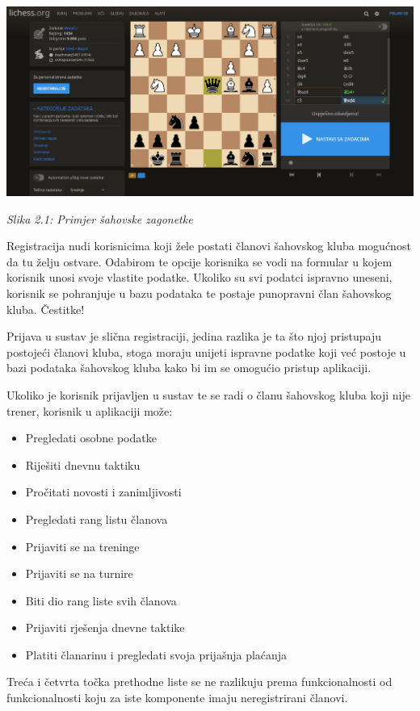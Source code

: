 \documentclass{article}
\begin{document}
		\includegraphics[width=\columnwidth]{lichess_primjer}
		\begin{center}
			\textit{Slika 2.1: Primjer šahovske zagonetke}
		\end{center}
		
		Registracija nudi korisnicima koji žele postati članovi šahovskog kluba mogućnost da tu želju ostvare. Odabirom te opcije korisnika se vodi na formular u kojem korisnik unosi svoje vlastite podatke. Ukoliko su svi podatci ispravno uneseni, korisnik se pohranjuje u bazu podataka te postaje punopravni član šahovskog kluba. Čestitke!
		
		Prijava u sustav je slična registraciji, jedina razlika je ta što njoj pristupaju postojeći članovi kluba, stoga moraju unijeti ispravne podatke koji već postoje u bazi podataka šahovskog kluba kako bi im se omogućio pristup aplikaciji. 
		
		Ukoliko je korisnik prijavljen u sustav te se radi o članu šahovskog kluba koji nije trener, korisnik u aplikaciji može: 
		\begin{itemize}
			\item Pregledati osobne podatke 
			\item Riješiti dnevnu taktiku 
			\item Pročitati novosti i zanimljivosti 
			\item Pregledati rang listu članova 
			\item Prijaviti se na treninge 
			\item Prijaviti se na turnire
			\item Biti dio rang liste svih članova 
			\item Prijaviti rješenja dnevne taktike 
			\item Platiti članarinu i pregledati svoja prijašnja plaćanja 
		\end{itemize}
		
		Treća i četvrta točka prethodne liste se ne razlikuju prema funkcionalnosti od funkcionalnosti koju za iste komponente imaju neregistrirani članovi. 
		
\end{document}

